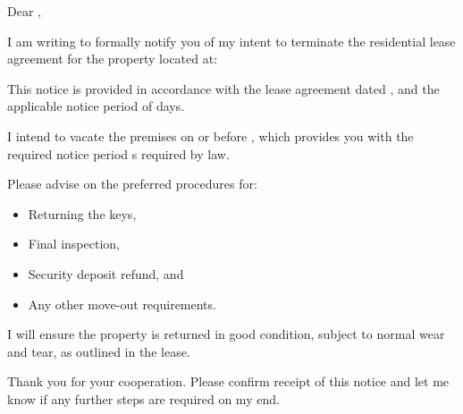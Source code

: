 
Dear \recipientName{},

I am writing to formally notify you of my intent to terminate the residential lease agreement for the property located at:

\LeaseLocationAddress{}

This notice is provided in accordance with the lease agreement dated \LeaseStartDate{}, and the applicable notice period of \NoticeDays{}  days.

I intend to vacate the premises on or before \MoveOutDate{}, which provides you with the required notice period s required by law.

Please advise on the preferred procedures for:
\begin{itemize}
  \item Returning the keys,
  \item Final inspection,
  \item Security deposit refund, and
  \item Any other move-out requirements.
\end{itemize}

I will ensure the property is returned in good condition, subject to normal wear and tear, as outlined in the lease.

Thank you for your cooperation. Please confirm receipt of this notice and let me know if any further steps are required on my end.